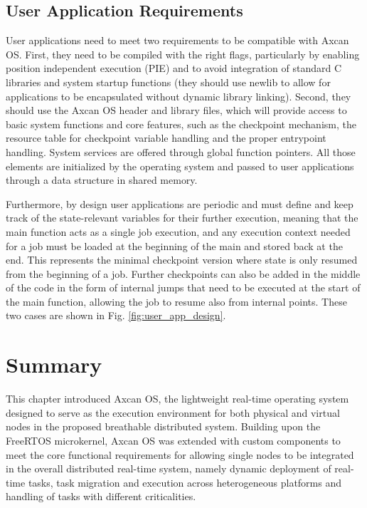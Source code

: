 \subsection{User Application Requirements}
User applications need to meet two requirements to be compatible with Axcan OS. First, they need to be compiled with the right flags, particularly by enabling position independent execution (PIE) and to avoid integration of standard C libraries and system startup functions (they should use newlib to allow for applications to be encapsulated without dynamic library linking). Second, they should use the Axcan OS header and library files, which will provide access to basic system functions and core features, such as the checkpoint mechanism, the resource table for checkpoint variable handling and the proper entrypoint handling. System services are offered through global function pointers. All those elements are initialized by the operating system and passed to user applications through a data structure in shared memory.

Furthermore, by design user applications are periodic and must define and keep track of the state-relevant variables for their further execution, meaning that the main function acts as a single job execution, and any execution context needed for a job must be loaded at the beginning of the main and stored back at the end. This represents the minimal checkpoint version where state is only resumed from the beginning of a job. Further checkpoints can also be added in the middle of the code in the form of internal jumps that need to be executed at the start of the main function, allowing the job to resume also from internal points. These two cases are shown in Fig. \ref{fig:user_app_design}.

\section{Summary}

This chapter introduced Axcan OS, the lightweight real-time operating system designed to serve as the execution environment for both physical and virtual nodes in the proposed breathable distributed system. Building upon the FreeRTOS microkernel, Axcan OS was extended with custom components to meet the core functional requirements for allowing single nodes to be integrated in the overall distributed real-time system, namely dynamic deployment of real-time tasks, task migration and execution across heterogeneous platforms and handling of tasks with different criticalities.

